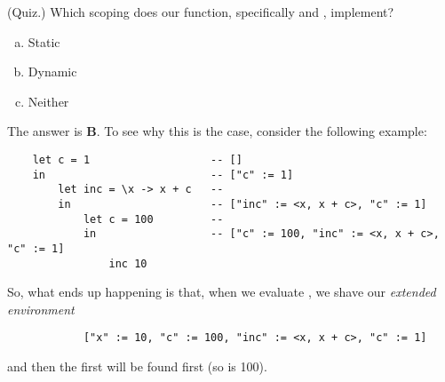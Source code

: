 \documentclass[letterpaper]{article}
\begin{document}
\begin{mdframed}[]
    (Quiz.) Which scoping does our  function, specifically  and , implement?
    \begin{enumerate}[(a)]
        \item Static 
        \item Dynamic 
        \item Neither 
    \end{enumerate} 

    \begin{mdframed}[]
        The answer is \textbf{B}. To see why this is the case, consider the following example:
        \begin{verbatim}
    let c = 1                   -- []
    in                          -- ["c" := 1]
        let inc = \x -> x + c   -- 
        in                      -- ["inc" := <x, x + c>, "c" := 1]
            let c = 100         --
            in                  -- ["c" := 100, "inc" := <x, x + c>, "c" := 1]
                inc 10 \end{verbatim}
        So, what ends up happening is that, when we evaluate , we shave our \emph{extended environment}
        \begin{verbatim}
            ["x" := 10, "c" := 100, "inc" := <x, x + c>, "c" := 1]\end{verbatim}
        and then the first  will be found first (so  is 100).
    \end{mdframed}
\end{mdframed}
\end{document}
